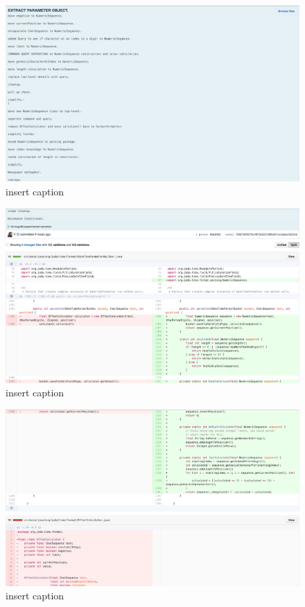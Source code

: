 \begin{figure}[H]
	\centering
	\includegraphics[width=\linewidth]{code130}
	\caption{insert caption}
\end{figure}
\begin{figure}[H]
	\centering
	\includegraphics[width=\linewidth]{code131}
	\caption{insert caption}
\end{figure}
\begin{figure}[H]
	\centering
	\includegraphics[width=\linewidth]{code132}
	\caption{insert caption}
\end{figure}
